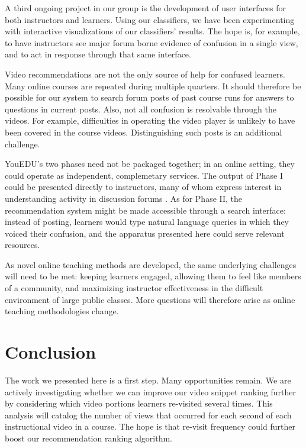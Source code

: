 \documentclass{edm_template}
\begin{document}
A third ongoing project in our group is the development of user
interfaces for both instructors and learners. Using our classifiers,
we have been experimenting with interactive visualizations of our
classifiers' results. The hope is, for example, to have instructors
see major forum borne evidence of confusion in a single view, and to
act in response through that same interface.

Video recommendations are not the only source of help for confused
learners. Many online courses are repeated during multiple
quarters. It should therefore be possible for our system to search
forum posts of past course runs for answers to questions in current
posts.  Also, not all confusion is resolvable through the videos. For
example, difficulties in operating the video player is unlikely to
have been covered in the course videos. Distinguishing such posts is
an additional challenge.

YouEDU's two phases need not be packaged together; in an online
setting, they could operate as independent, complemetary services. The
output of Phase I could be presented directly to instructors, many of
whom express interest in understanding activity in discussion forums
\cite{Stephens-Martinez:2014:MMI:2556325.2566246}. As for Phase II,
the recommendation system might be made accessible through a search
interface: instead of posting, learners would type natural language
queries in which they voiced their confusion, and the apparatus
presented here could serve relevant resources.

As novel online teaching methods are developed, the same underlying
challenges will need to be met: keeping learners engaged, allowing
them to feel like members of a community, and maximizing instructor
effectiveness in the difficult environment of large public classes.
More questions will therefore arise as online teaching methodologies
change.

\section{Conclusion}
\label{sec:conclusion}
The work we presented here is a first step. Many opportunities
remain. We are actively investigating whether we can improve our video
snippet ranking further by considering which video portions learners
re-visited several times. This analysis will catalog the number of
views that occurred for each second of each instructional video in a
course. The hope is that re-visit frequency could further boost our
recommendation ranking algorithm. 
\end{document}
